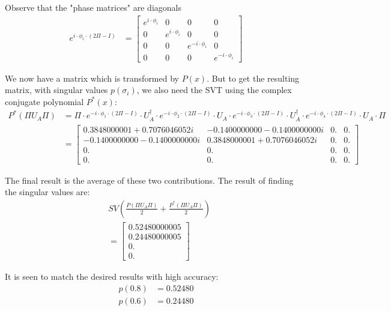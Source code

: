 \documentclass{article}
\begin{document}
\noindent Observe that the "phase matrices" are diagonals
\begin{align*}
    e^{i \cdot \phi_i \cdot (2\Pi - I)} &= \begin{bmatrix} e^{i \cdot \phi_i} & 0 & 0 & 0 \\ 0 & e^{i \cdot \phi_i} & 0 & 0 \\ 0 & 0 & e^{-i \cdot \phi_i} & 0 \\ 0 & 0 & 0 & e^{-i \cdot \phi_i} \end{bmatrix} 
\end{align*}

\noindent  We now have a matrix which is transformed by $P(x)$. But to get the resulting matrix, with singular values $p(\sigma_i)$, we also need the SVT using the complex conjugate polynomial $P^*(x)$:
\begin{align*}
 P^*(\Pi U_A \Pi) & =  \Pi \cdot e^{-i\cdot\phi_1\cdot(2\Pi - I)} \cdot U_A^{\dagger} \cdot e^{-i\cdot\phi_2\cdot(2\Pi - I)} \cdot U_A \cdot e^{-i\cdot\phi_3\cdot(2\Pi - I)} \cdot U_A^{\dagger} \cdot e^{-i\cdot\phi_4\cdot(2\Pi - I)} \cdot U_A \cdot \Pi\\
& = \begin{bmatrix}
0.3848000001 + 0.7076046052i & -0.1400000000 - 0.1400000000i & 0. & 0. \\
-0.1400000000 - 0.1400000000i & 0.3848000001 + 0.7076046052i & 0. & 0. \\
0. & 0. & 0. & 0. \\
0. & 0. & 0. & 0.
\end{bmatrix}
\end{align*}

\noindent The final result is the average of these two contributions. The result of finding the singular values are:
\begin{align*}
    &SV \left( \frac{P(\Pi U_A \Pi)}{2} + \frac{P^*(\Pi U_A \Pi)}{2} \right) \\
    &= \begin{bmatrix} 0.52480000005 \\ 0.24480000005 \\ 0. \\ 0. \end{bmatrix} 
\end{align*}

\noindent It is seen to match the desired results with high accuracy:
\begin{align*}
    p(0.8) &= 0.52480  \\
    p(0.6) &= 0.24480
\end{align*}
\end{document}
